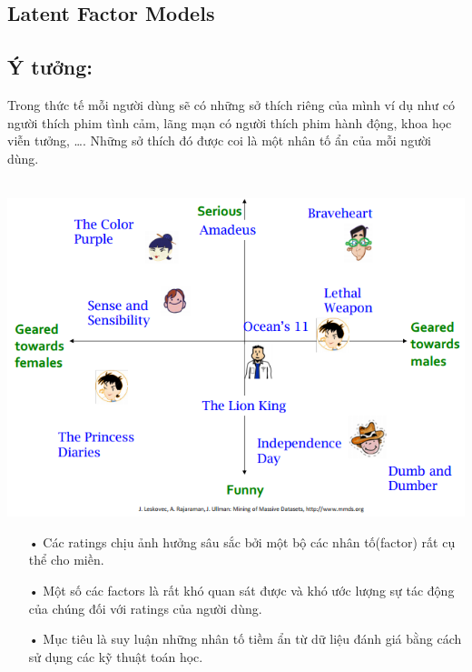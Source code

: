 \documentclass[a0,portrait,11pt]{a0poster}
\begin{document}
\begin{multicols}{2}
\begin{mybox}
\section*{Latent Factor Models}
\subsection*{Ý tưởng:}
Trong thức tế mỗi người dùng sẽ có những sở thích riêng của mình ví dụ như có người thích phim tình cảm, lãng mạn có người thích phim hành động, khoa học viễn tưởng, \ldots . Những sở thích đó được coi là một nhân tố ẩn của mỗi người dùng. \\ \\
\begin{minipage}[c]{0.45\linewidth}
\includegraphics[width=0.8\linewidth]{LF.png}
\end{minipage}
\begin{minipage}[c]{0.45\linewidth}
\begin{itemize}
\item[•] Các ratings chịu ảnh hưởng sâu sắc bởi một bộ các nhân tố(factor) rất cụ thể cho miền.
\item[•] Một số các factors là rất khó quan sát được và khó ước lượng sự tác động của chúng đối với ratings của người dùng.
\item[•] Mục tiêu là suy luận những nhân tố tiềm ẩn từ dữ liệu đánh giá bằng cách sử dụng các kỹ thuật toán học.
\end{itemize}
\end{minipage}

\end{mybox}
\end{multicols}
\end{document}
